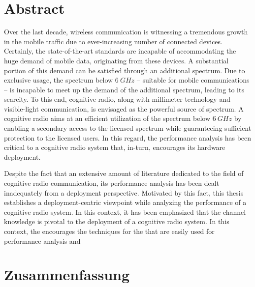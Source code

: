 
\chapter*{Abstract}
Over the last decade, wireless communication is witnessing a tremendous growth in the mobile traffic due to ever-increasing number of connected devices. Certainly, the state-of-the-art standards are incapable of accommodating the huge demand of mobile data, originating from these devices. A substantial portion of this demand can be satisfied through an additional spectrum. Due to exclusive usage, the spectrum below $\SI{6}{GHz}$ -- suitable for mobile communications -- is incapable to meet up the demand of the additional spectrum, leading to its scarcity. To this end, cognitive radio, along with millimeter technology and visible-light communication, is envisaged as the powerful source of spectrum. A cognitive radio aims at an efficient utilization of the spectrum below $\SI{6}{GHz}$ by enabling a secondary access to the licensed spectrum while guaranteeing sufficient protection to the licensed users. In this regard, the performance analysis has been critical to a cognitive radio system that, in-turn, encourages its hardware deployment. 


Despite the fact that an extensive amount of literature dedicated to the field of cognitive radio communication, its performance analysis has been dealt inadequately from a deployment perspective. Motivated by this fact, this thesis establishes a deployment-centric viewpoint while analyzing the performance of a cognitive radio system. In this context, it has been emphasized that the channel knowledge is pivotal to the deployment of a cognitive radio system. In this context, the encourages the techniques for the that are easily used for performance analysis and   

\cleardoublepage
\chapter*{Zusammenfassung}


\cleardoublepage
